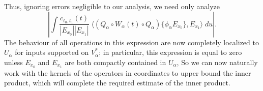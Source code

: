 \documentclass[dvipsnames,letterpaper,12pt]{article}
\newtheorem{lemma}[theorem]{Lemma}
\begin{document}
Thus, ignoring errors negligible to our analysis, we need only analyze
%
\[ \left| \int \frac{c_{t_0,t_1}(t)}{|E_{x_0}| |E_{x_1}|}\; \big\langle (Q_\alpha \circ W_\alpha(t) \circ Q_\alpha) \{ \phi_\alpha E_{x_0} \}, E_{x_1} \big\rangle\; du \right|. \]
%
The behaviour of all operations in this expression are now completely localized to $U_\alpha$ for inputs supported on $V^*_\alpha$; in particular, this expression is equal to zero unless $E_{x_0}$ and $E_{x_1}$ are both compactly contained in $U_\alpha$, So we can now naturally work with the kernels of the operators in coordinates to upper bound the inner product, which will complete the required estimate of the inner product.

\end{document}
